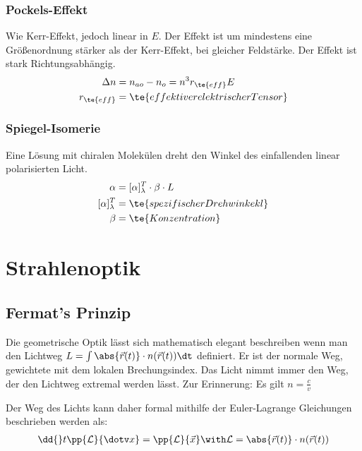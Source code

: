 \documentclass[twocolumn, unnumberedsubsub]{summery_5.0} %
\begin{document}
\subsubsection{Pockels-Effekt}
Wie Kerr-Effekt, jedoch linear in \(E\). Der Effekt ist um mindestens eine 
Größenordnung stärker als der Kerr-Effekt, bei gleicher Feldstärke.
Der Effekt ist stark Richtungsabhängig.
\begin{align*}
    \Delta n &= n_{ao} - n_o = n^3 r_{\te{eff}} E \\
    r_{\te{eff}} &= \te{effektiver elektrischer Tensor}
\end{align*}

\subsubsection{Spiegel-Isomerie}
Eine Lösung mit chiralen Molekülen dreht den Winkel des einfallenden linear polarisierten
Licht. 
\begin{align*}
    \alpha &= [\alpha]^T_\lambda \cdot \beta \cdot L \\
    [\alpha]^T_\lambda &= \te{spezifischer Drehwinkekl}\\
    \beta &= \te{Konzentration}\\ 
\end{align*}

\section{Strahlenoptik}
\subsection{Fermat's Prinzip}
Die geometrische Optik lässt sich mathematisch elegant beschreiben wenn man den Lichtweg 
\(L = \int \abs{\vec r(t)}\cdot n(\vec r (t)) \dt\) definiert. Er ist der normale Weg, gewichtete 
mit dem lokalen Brechungsindex.
Das Licht nimmt immer den Weg, der den Lichtweg extremal werden lässt.
Zur Erinnerung: Es gilt \(n = \frac{c}{v}\)

Der Weg des Lichts kann daher formal mithilfe der Euler-Lagrange Gleichungen beschrieben werden als:
\begin{align*}
    \dd {}t \pp{\mathcal L}{\dotv x} = \pp{\mathcal L}{\vec x} \with \mathcal L = \abs{\vec r(t)}\cdot n(\vec r (t))
\end{align*}
\end{document}
